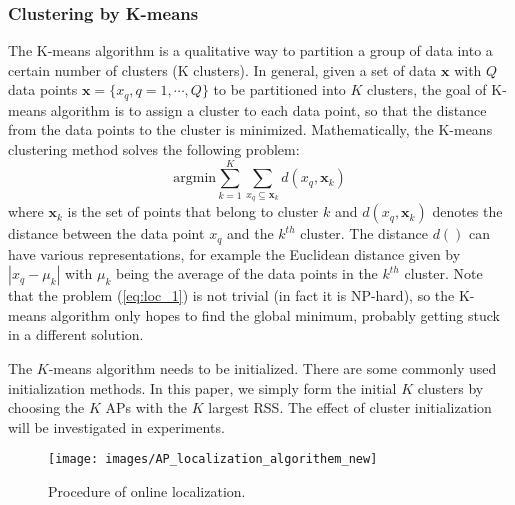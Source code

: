 \documentclass[10pt, conference, letterpaper]{IEEEtran}
\begin{document}
\subsubsection{Clustering by K-means}
The K-means algorithm is a qualitative way to partition a group of data into a certain number of clusters (K clusters). 
In general, given a set of data $\mathbf{x}$ with $Q$ data points $\mathbf{x}=\{x_q, q=1, \cdots, Q\}$ to be partitioned into $K$ clusters, 
the goal of K-means algorithm is to assign a cluster to each data point, so that the distance from the data points to the cluster is minimized. 
Mathematically, the K-means clustering method solves the following problem:
\begin{equation}\label{eq:loc_1}
\mathrm{argmin} \sum_{k=1}^K \sum_{x_q \subseteq \mathbf{x}_k} d(x_q, \mathbf{x}_k)
\end{equation}
where $\mathbf{x}_k$ is the set of points that belong to cluster $k$ and $d(x_q, \mathbf{x}_k)$ denotes the distance between the data point $x_q$ and the $k^{th}$ cluster. 
The distance $d()$ can have various representations, for example the Euclidean distance given by $|x_q-\mu_k|$ with $\mu_k$ being the average of the data points in the $k^{th}$ cluster. 
Note that the problem (\ref{eq:loc_1}) is not trivial (in fact it is NP-hard), so the K-means algorithm only hopes to find the global minimum, probably getting stuck in a different solution.

The $K$-means algorithm needs to be initialized. 
There are some commonly used initialization methods. 
In this paper, we simply form the initial $K$ clusters by choosing the $K$ APs with the $K$ largest RSS. 
The effect of cluster initialization will be investigated in experiments.

\begin{figure}
\centering
\texttt{[image: images/AP\_localization\_algorithem\_new]}
\caption{Procedure of online localization.}
\label{fig:algorithm_detailed}
\vspace{-0.2in}
\end{figure}
\end{document}
